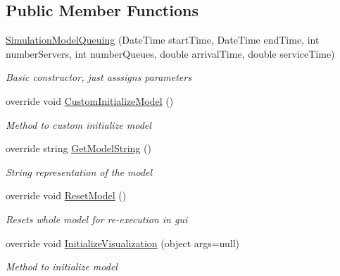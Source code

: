 \subsection*{Public Member Functions}
\begin{DoxyCompactItemize}
\item 
\hyperlink{class_simple_queue_example_1_1_model_elements_1_1_simulation_model_queuing_ac46c41a84d56f5f2a4fd3d6632e1570e}{Simulation\+Model\+Queuing} (Date\+Time start\+Time, Date\+Time end\+Time, int number\+Servers, int number\+Queues, double arrival\+Time, double service\+Time)
\begin{DoxyCompactList}\small\item\em Basic constructor, just asssigns parameters \end{DoxyCompactList}\item 
override void \hyperlink{class_simple_queue_example_1_1_model_elements_1_1_simulation_model_queuing_a58e8c5559af2a7b4ff71d39b1c410299}{Custom\+Initialize\+Model} ()
\begin{DoxyCompactList}\small\item\em Method to custom initialize model \end{DoxyCompactList}\item 
override string \hyperlink{class_simple_queue_example_1_1_model_elements_1_1_simulation_model_queuing_a5991f6b4ddd8289562748f4a529d1625}{Get\+Model\+String} ()
\begin{DoxyCompactList}\small\item\em String representation of the model \end{DoxyCompactList}\item 
override void \hyperlink{class_simple_queue_example_1_1_model_elements_1_1_simulation_model_queuing_aa11638c1f3ae95a818a491e2869567ae}{Reset\+Model} ()
\begin{DoxyCompactList}\small\item\em Resets whole model for re-\/execution in gui \end{DoxyCompactList}\item 
override void \hyperlink{class_simple_queue_example_1_1_model_elements_1_1_simulation_model_queuing_a29969ed6c3d18ac44b5cd4129e4668d5}{Initialize\+Visualization} (object args=null)
\begin{DoxyCompactList}\small\item\em Method to initialize model \end{DoxyCompactList}\end{DoxyCompactItemize}
